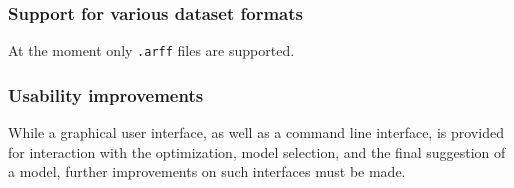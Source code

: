 	\subsubsection{Support for various dataset formats}
	At the moment only \texttt{.arff} files are supported.

	\subsubsection{Usability improvements}
	While a graphical user interface, as well as a command line interface, is provided for
	interaction with the optimization, model selection, and the final suggestion of a model, further
	improvements on such interfaces must be made.
